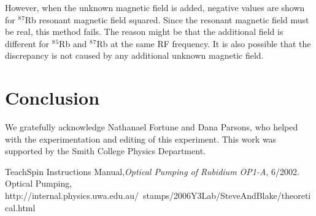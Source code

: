\documentclass[prb,preprint]{revtex4-1}
\begin{document}
However, when the unknown magnetic field is added, negative values are shown for $^8$$^7$Rb resonant magnetic field squared. Since the resonant magnetic field must be real, this method fails. The reason might be that the additional field is different for $^8$$^5$Rb and $^8$$^7$Rb at the same RF frequency. It is also possible that the discrepancy is not caused by any additional unknown magnetic field. 


\section{Conclusion}


\begin{acknowledgments}

We gratefully acknowledge Nathanael Fortune and Dana Parsons, who helped with the experimentation and editing of this experiment.  This work was supported by the Smith College Physics Department.

\end{acknowledgments}


\begin{thebibliography}{99}

 TeachSpin Instructions Manual,\textit{Optical Pumping of Rubidium OP1-A}, 6/2002.
 Optical Pumping, http://internal.physics.uwa.edu.au/~stamps/2006Y3Lab/SteveAndBlake/theoretical.html

\end{thebibliography}

\end{document}
